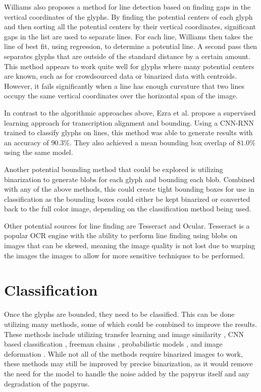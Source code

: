 Williams \cite{Williams2014} also proposes a method for line detection based on finding gaps in the vertical coordinates of the glyphs. By finding the potential centers of each glyph and then sorting all the potential centers by their vertical coordinates, significant gaps in the list are used to separate lines. For each line, Williams then takes the line of best fit, using regression, to determine a potential line. A second pass then separates glyphs that are outside of the standard distance by a certain amount. This method appears to work quite well for glyphs where many potential centers are known, such as for crowdsourced data or binarized data with centroids. However, it fails significantly when a line has enough curvature that two lines occupy the same vertical coordinates over the horizontal span of the image.

In contrast to the algorithmic approaches above, Ezra et al.\cite{Ezra} propose a supervised learning approach for transcription alignment and bounding. Using a CNN-RNN trained to classify glyphs on lines, this method was able to generate results with an accuracy of $90.3\%$. They also achieved a mean bounding box overlap of $81.0\%$ using the same model.

Another potential bounding method that could be explored is utilizing binarization to generate blobs for each glyph and bounding each blob. Combined with any of the above methods, this could create tight bounding boxes for use in classification as the bounding boxes could either be kept binarized or converted back to the full color image, depending on the classification method being used.

Other potential sources for line finding are Tesseract\cite{SmithTesseract} and Ocular\cite{Berg-Kirkpatrick}. Tesseract is a popular OCR engine with the ability to perform line finding \cite{SmithLines} using blobs on images that can be skewed, meaning the image quality is not lost due to warping the images the images to allow for more sensitive techniques to be performed.

\section{Classification}
Once the glyphs are bounded, they need to be classified. This can be done utilizing many methods, some of which could be combined to improve the results.
These methods include utilizing transfer learning and image similarity \cite{Vadicamo, Yuan}, CNN based classification \cite{Yousefi, Haliassos, Swindall}, freeman chains \cite{Althobaiti}, probabilistic models \cite{Berg-Kirkpatrick}, and image deformation \cite{Nederhof, Keysers, Tabin, Gass}. While not all of the methods require binarized images to work, these methods may still be improved by precise binarization, as it would remove the need for the model to handle the noise added by the papyrus itself and any degradation of the papyrus.


